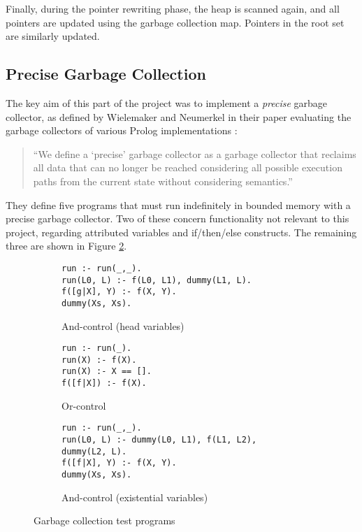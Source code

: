Finally, during the pointer rewriting phase, the heap is scanned again, and all pointers are updated using the garbage collection map. Pointers in the root set are similarly updated.

\subsection{Precise Garbage Collection}

The key aim of this part of the project was to implement a \emph{precise} garbage collector, as defined by Wielemaker and Neumerkel in their paper evaluating the garbage collectors of various Prolog implementations \cite{wielemakerPreciseGarbageCollection2008}:

\begin{quote}
``We define a `precise' garbage collector as a garbage collector that reclaims all data that can no longer be reached considering all possible execution paths from the current state without considering semantics.''
\end{quote}

They define five programs that must run indefinitely in bounded memory with a precise garbage collector. Two of these concern functionality not relevant to this project, regarding attributed variables and if/then/else constructs. The remaining three are shown in Figure \ref{fig:gc-programs}.

\begin{figure}[H]
\centering
\begin{subfigure}{.65\textwidth}
\centering
\begin{verbatim}
run :- run(_,_).
run(L0, L) :- f(L0, L1), dummy(L1, L).
f([g|X], Y) :- f(X, Y).
dummy(Xs, Xs).
\end{verbatim}
\caption{And-control (head variables)}
\end{subfigure}%
\begin{subfigure}{.35\textwidth}
\centering
\begin{verbatim}
run :- run(_).
run(X) :- f(X).
run(X) :- X == [].
f([f|X]) :- f(X).
\end{verbatim}
\caption{Or-control}
\label{fig:or-control}
\end{subfigure}
\par\bigskip
\par\bigskip
\begin{subfigure}{\textwidth}
\centering
\begin{verbatim}
run :- run(_,_).
run(L0, L) :- dummy(L0, L1), f(L1, L2), dummy(L2, L).
f([f|X], Y) :- f(X, Y).
dummy(Xs, Xs).
\end{verbatim}
\caption{And-control (existential variables)}
\end{subfigure}
\caption{Garbage collection test programs}
\label{fig:gc-programs}
\end{figure}

